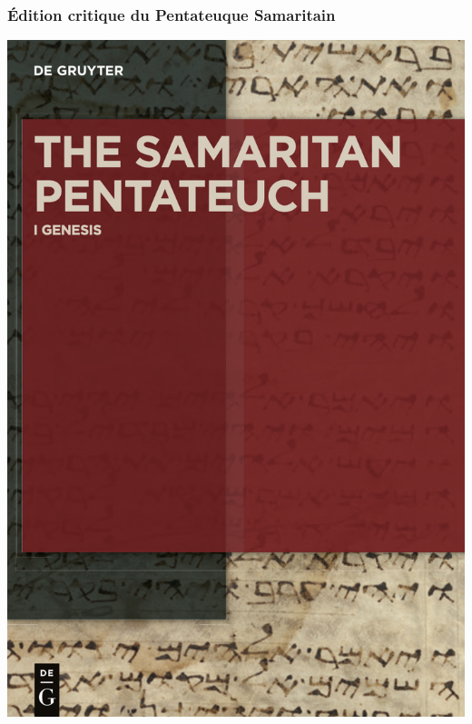 \documentclass[11pt]{beamer}
\begin{document}
\begin{frame}
\frametitle{Édition critique du Pentateuque Samaritain}
\begin{minipage}{0.48\textwidth}
    \centering
    \includegraphics[width=\textwidth]{img/sam_couv.png}
\end{minipage}
\hfill
\begin{minipage}{0.48\textwidth}
    \centering

\end{minipage}
\end{frame}
\end{document}
